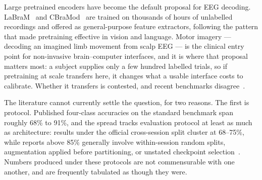 %
%


Large pretrained encoders have become the default proposal for EEG decoding.
LaBraM~\cite{jiang2024labram} and CBraMod~\cite{wang2025cbramod} are trained on
thousands of hours of unlabelled recordings and offered as general-purpose
feature extractors, following the pattern that made pretraining effective in
vision and language. Motor imagery --- decoding an imagined limb movement from
scalp EEG --- is the clinical entry point for non-invasive brain--computer
interfaces, and it is where that proposal matters most: a subject supplies only
a few hundred labelled trials, so if pretraining at scale transfers here, it
changes what a usable interface costs to calibrate. Whether it transfers is
contested, and recent benchmarks
disagree~\cite{kontras2026neuroatlas,zare2026negativecontrol}.

The literature cannot currently settle the question, for two reasons. The first
is protocol. Published four-class accuracies on the standard benchmark span
roughly 68\% to 91\%, and the spread tracks evaluation protocol at least as
much as architecture: results under the official cross-session split cluster at
68--75\%, while reports above 85\% generally involve within-session random
splits, augmentation applied before partitioning, or unstated checkpoint
selection~\cite{yu2022lffn}. Numbers produced under these protocols are not
commensurable with one another, and are frequently tabulated as though they
were.

